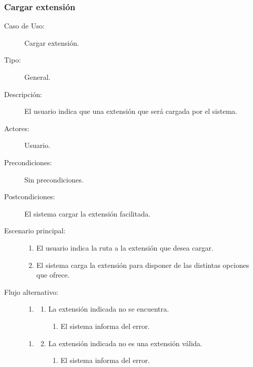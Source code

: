 \subsubsection{Cargar extensión}

\begin{description}
   \item[Caso de Uso:]  Cargar extensión.
   \item[Tipo:] General.
   \item[Descripción:] 
   El usuario indica que una extensión que será cargada por
   el sistema.
   \item[Actores:] 
   Usuario.
   \item[Precondiciones:] 
   Sin precondiciones.
   \item[Postcondiciones:] 
   El sistema cargar la extensión facilitada.
   \item[Escenario principal:] \hfill
   \begin{enumerate}
   \item El usuario indica la ruta a la extensión que desea cargar.
   \item El sistema carga la extensión para disponer de las distintas opciones que 
   ofrece. 
   \end{enumerate}
   \item[Flujo alternativo:] \hfill 
   \begin{enumerate} \itemsep1pt \parskip0pt 
   \setcounter{enumi}{1}
   \renewcommand{\labelenumi}{}
   \renewcommand{\labelenumiii}{\arabic{enumiii}.}
   \renewcommand{\labelenumii}{\arabic{enumi}\alph{enumii}.}
      \item 
      \begin {enumerate}
         \setcounter{enumii}{0}
         \item La extensión indicada no se encuentra.
         \begin{enumerate}
         \item El sistema informa del error.
         \end{enumerate}
      \end{enumerate}
   \end{enumerate}
   \begin{enumerate} \itemsep1pt \parskip0pt 
   \setcounter{enumi}{1}
   \renewcommand{\labelenumi}{}
   \renewcommand{\labelenumiii}{\arabic{enumiii}.}
   \renewcommand{\labelenumii}{\arabic{enumi}\alph{enumii}.}
      \item 
      \begin {enumerate}
         \setcounter{enumii}{1}
         \item La extensión indicada no es una extensión válida.
         \begin{enumerate}
         \item El sistema informa del error.
         \end{enumerate}
      \end{enumerate}
   \end{enumerate}
\end{description}

